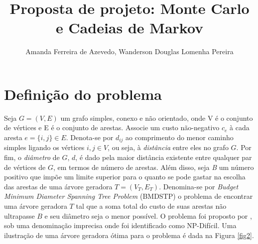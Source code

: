 \documentclass[12pt]{article}
\title{Proposta de projeto: Monte Carlo e Cadeias de Markov}
\author{Amanda Ferreira de Azevedo\inst{1}, Wanderson Douglas Lomenha Pereira\inst{1}}
\begin{document}
 

\maketitle

%     

\section{Definição do problema}


Seja $G = (V, E)$ um grafo simples, conexo e não orientado, onde V é o conjunto de vértices e E é o conjunto de arestas. Associe um custo não-negativo $c_e$ à cada aresta $e = \{i,j\} \in E$. Denota-se por $d_{ij}$ ao comprimento do menor caminho simples ligando os vértices $i,j \in V$, ou seja, à \textit{distância} entre eles no grafo $G$. Por fim, o \textit{diâmetro} de $G$, $d$, é dado pela maior distância existente entre qualquer par de vértices de $G$, em termos de número de arestas. Além disso, seja \textit{B} um número positivo que impõe um limite superior para o quanto se pode gastar na escolha das arestas de uma árvore geradora $T = (V_T, E_T)$. Denomina-se por \textit{Budget Minimum Diameter Spanning Tree Problem} (BMDSTP) o problema de encontrar uma árvore geradora $T$ tal que a soma total do custo de suas arestas não ultrapasse $B$ e seu diâmetro seja o menor possível. O problema foi proposto por \cite{Plesnik1981}, sob uma denominação imprecisa onde foi identificado como NP-Difícil. Uma ilustração de uma árvore geradora ótima para o problema é dada na Figura \ref{fig2}. 
\end{document}
